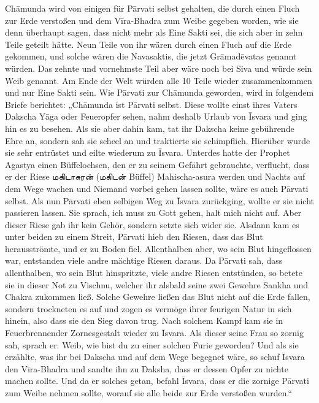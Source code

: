 \documentclass{article}
\newcommand{\TamilText}[1]{\texttamil{#1}}
\newcommand{\tam}[1]{\TamilText{#1}}
\begin{document}
Ch\={a}munda wird von einigen für P\={a}rvati selbst gehalten, die durch einen Fluch zur Erde verstoßen und dem V\={i}ra-Bhadra zum Weibe gegeben worden, wie sie denn überhaupt sagen, dass nicht mehr als Eine Sakti sei, die sich aber in zehn Teile geteilt hätte. Neun Teile von ihr wären durch einen Fluch auf die Erde gekommen, und solche wären die Navasaktis, die jetzt Gr\={a}mad\={e}vatas genannt würden. Das zehnte und vornehmste Teil aber wäre noch bei Siva und würde sein Weib genannt. Am Ende der Welt würden alle 10 Teile wieder zusammenkommen und nur Eine Sakti sein. Wie P\={a}rvati zur Ch\={a}munda geworden, wird in folgendem Briefe berichtet: „Ch\={a}munda ist P\={a}rvati selbst. Diese wollte einst ihres Vaters Dakscha Y\={a}ga oder Feueropfer sehen, nahm deshalb Urlaub von \={I}svara und ging hin es zu besehen. Als sie aber dahin kam, tat ihr Dakscha keine gebührende Ehre an, sondern sah sie scheel an und traktierte sie schimpflich. Hierüber wurde sie sehr entrüstet und eilte wiederum zu \={I}svara. Unterdes hatte der Prophet Agastya einen Büffelochsen, den er zu seinem Gefährt gebrauchte, verflucht, dass er der Riese \tam{மகிடாசுரன்} (\tam{மகிடன்} Büffel) Mahischa-asura werden und Nachts auf dem Wege wachen und Niemand vorbei gehen lassen sollte, wäre es auch P\={a}rvati selbst. Als nun P\={a}rvati eben selbigen Weg zu \={I}svara zurückging, wollte er sie nicht passieren lassen. Sie sprach, ich muss zu Gott gehen, halt mich nicht auf. Aber dieser Riese gab ihr kein Gehör, sondern setzte sich wider sie. Alsdann kam es unter beiden zu einem Streit, P\={a}rvati hieb den Riesen, dass das Blut herausströmte, und er zu Boden fiel. Allenthalben aber, wo sein Blut hingeflossen war, entstanden viele andre mächtige Riesen daraus. Da P\={a}rvati sah, dass allenthalben, wo sein Blut hinspritzte, viele andre Riesen entstünden, so betete sie in dieser Not zu Vischnu, welcher ihr alsbald seine zwei Gewehre Sankha und Chakra zukommen ließ. Solche Gewehre ließen das Blut nicht auf die Erde fallen, sondern trockneten es auf und zogen es vermöge ihrer feurigen Natur in sich hinein, also dass sie den Sieg davon trug. Nach solchem Kampf kam sie in Feuerbrennender Zornesgestalt wieder zu \={I}svara. Als dieser seine Frau so zornig sah, sprach er: Weib, wie bist du zu einer solchen Furie geworden? Und als sie erzählte, was ihr bei Dakscha und auf dem Wege begegnet wäre, so schuf \={I}svara den V\={i}ra-Bhadra und sandte ihn zu Daksha, dass er dessen Opfer zu nichte machen sollte. Und da er solches getan, befahl \={I}svara, dass er die zornige P\={a}rvati zum Weibe nehmen sollte, worauf sie alle beide zur Erde verstoßen wurden.“
\end{document}
